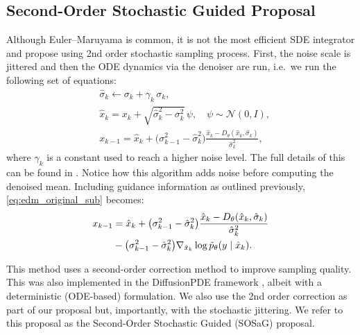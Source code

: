 \subsection{Second-Order Stochastic Guided Proposal}
Although Euler--Maruyama is common, it is not the most efficient SDE integrator and \citet{karras2022elucidatingdesignspacediffusionbased} propose using 2nd order 
stochastic sampling process. %
First, the noise scale is jittered and then the
ODE dynamics via the denoiser are run, i.e.\ we run the following set of
equations:
\begin{align}
    &\hat{\sigma}_{k} \leftarrow \sigma_{k} + \gamma_{k}\,\sigma_{k}, \\
    &\hat{x}_{k} = x_{k} + \sqrt{\hat{\sigma}^{2}_{k} - \sigma^{2}_{k}}\,\psi,
       \quad \psi \sim \mathcal{N}(0, I), \\
    &x_{k-1} = \hat{x}_{k} + \bigl(\sigma^{2}_{k-1} - \hat{\sigma}^{2}_{k}\bigr)
       \frac{\hat{x}_{k} - D_{\theta}(\hat{x}_{k}, \hat{\sigma}_{k})}{\hat{\sigma}^{2}_{k}},
       \label{eq:edm_original_sub}
\end{align}
where $\gamma_{k}$ is a constant used to reach a higher noise level. The full details of this can be found in \citet{karras2022elucidatingdesignspacediffusionbased}. Notice how this algorithm adds noise before computing the denoised mean. Including guidance information as outlined previously, \eqref{eq:edm_original_sub} becomes:
\begin{align}
    x_{k-1} &= \hat{x}_{k} + \bigl(\sigma^{2}_{k-1} - \hat{\sigma}^{2}_{k}\bigr)
    \frac{\hat{x}_{k} - D_{\theta}(\hat{x}_{k}, \hat{\sigma}_{k})}{\hat{\sigma}^{2}_{k}} \nonumber \\
    & - \bigl(\sigma^{2}_{k-1} - \hat{\sigma}^{2}_{k}\bigr) \nabla_{\hat{x}_{k}} \log \Tilde{p}_\theta(y \mid \hat{x}_{k}).
    \label{eq:SOSaG_proposal}
\end{align}

This method uses a second-order correction method to improve
sampling quality. This was also implemented in the DiffusionPDE framework
\citep{huang2024diffusionpdegenerativepdesolvingpartial}, albeit with a deterministic (ODE-based) formulation. We also use the 2nd order correction as part of our proposal but, importantly, with the stochastic jittering.
We refer to this proposal as the Second-Order Stochastic Guided (SOSaG) proposal. 

